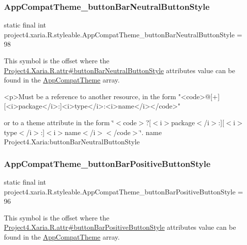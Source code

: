 \subsubsection{\texorpdfstring{App\+Compat\+Theme\+\_\+button\+Bar\+Neutral\+Button\+Style}{AppCompatTheme\_buttonBarNeutralButtonStyle}}
{\footnotesize\ttfamily static final int project4.\+xaria.\+R.\+styleable.\+App\+Compat\+Theme\+\_\+button\+Bar\+Neutral\+Button\+Style = 98\hspace{0.3cm}{\ttfamily [static]}}

This symbol is the offset where the \hyperlink{}{Project4.\+Xaria.\+R.\+attr\#button\+Bar\+Neutral\+Button\+Style} attribute\textquotesingle{}s value can be found in the \hyperlink{classproject4_1_1xaria_1_1R_1_1styleable_aad8bec413e2350f9404e6ff0e831a85d}{App\+Compat\+Theme} array.

\begin{DoxyVerb}      <p>Must be a reference to another resource, in the form "<code>@[+][<i>package</i>:]<i>type</i>:<i>name</i></code>"
\end{DoxyVerb}
 or to a theme attribute in the form \char`\"{}$<$code$>$?\mbox{[}$<$i$>$package$<$/i$>$\+:\mbox{]}\mbox{[}$<$i$>$type$<$/i$>$\+:\mbox{]}$<$i$>$name$<$/i$>$$<$/code$>$\char`\"{}.  name Project4.\+Xaria\+:button\+Bar\+Neutral\+Button\+Style \mbox{\label{classproject4_1_1xaria_1_1R_1_1styleable_a47fda447e64af3bb3b8673d0c9ad9c53}} 
\subsubsection{\texorpdfstring{App\+Compat\+Theme\+\_\+button\+Bar\+Positive\+Button\+Style}{AppCompatTheme\_buttonBarPositiveButtonStyle}}
{\footnotesize\ttfamily static final int project4.\+xaria.\+R.\+styleable.\+App\+Compat\+Theme\+\_\+button\+Bar\+Positive\+Button\+Style = 96\hspace{0.3cm}{\ttfamily [static]}}

This symbol is the offset where the \hyperlink{}{Project4.\+Xaria.\+R.\+attr\#button\+Bar\+Positive\+Button\+Style} attribute\textquotesingle{}s value can be found in the \hyperlink{classproject4_1_1xaria_1_1R_1_1styleable_aad8bec413e2350f9404e6ff0e831a85d}{App\+Compat\+Theme} array.

